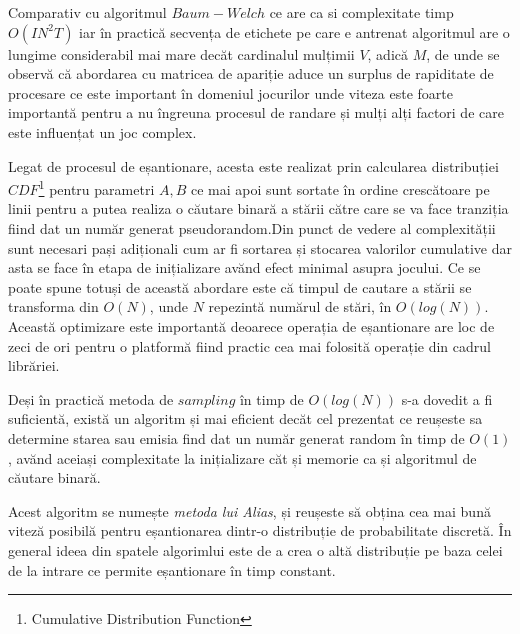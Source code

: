 Comparativ cu algoritmul $Baum-Welch$ ce are ca si complexitate timp $O(IN^{2}T)$ iar în practică secvența de etichete pe care e antrenat algoritmul are o lungime considerabil mai mare decăt cardinalul mulțimii $V$, adică $M$, de unde se observă că abordarea cu matricea de apariție aduce un surplus de rapiditate de procesare ce este important în domeniul jocurilor unde viteza este foarte importantă pentru a nu îngreuna procesul de randare și mulți alți factori de care este influențat un joc complex.\par

Legat de procesul de eșantionare, acesta este realizat prin calcularea distribuției $CDF$\footnote{Cumulative Distribution Function} pentru parametri $A,B$ ce mai apoi sunt sortate în ordine crescătoare pe linii pentru a putea realiza o căutare binară a stării către care se va face tranziția fiind dat un număr generat pseudorandom.Din punct de vedere al complexității sunt necesari pași adiționali cum ar fi sortarea și stocarea valorilor cumulative dar asta se face în etapa de inițializare avănd efect minimal asupra jocului. Ce se poate spune totuși de această abordare este că timpul de cautare a stării se transforma din $O(N)$, unde $N$ repezintă numărul de stări, în $O(log(N))$. Această optimizare este importantă deoarece operația de eșantionare are loc de zeci de ori pentru o platformă fiind practic cea mai folosită operație din cadrul librăriei.\par

Deși în practică metoda de $sampling$ în timp de $O(log(N))$ s-a dovedit a fi suficientă, există un algoritm și mai eficient decăt cel prezentat ce reușeste sa determine starea sau emisia find dat un număr generat random în timp de $O(1)$, avănd aceiași complexitate la inițializare căt și memorie ca și algoritmul de căutare binară.\par

Acest algoritm se numește \textit{metoda lui Alias}, și reușeste să obțina cea mai bună viteză posibilă pentru eșantionarea dintr-o distribuție de probabilitate discretă. În general ideea din spatele algorimlui este de a crea o altă distribuție pe baza celei de la intrare ce permite eșantionare în timp constant.\par
